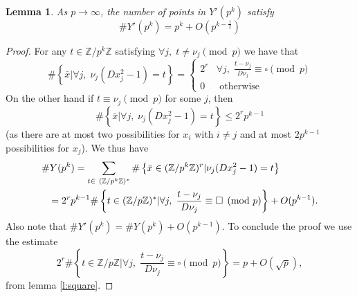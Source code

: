 \documentclass[12pt]{amsart}
\newtheorem{lem}{Lemma}[section]
\theoremstyle{definition}
\theoremstyle{remark}
\numberwithin{equation}{section}
\newcommand{\set}[1]{\left\{#1\right\}}
\newcommand{\bbZ}{\mathbb{Z}}
\begin{document}
\begin{lem}\label{l:count1}
As $p\to\infty$, the number of points in $Y'(p^k)$ satisfy
\[\# Y'(p^k)=p^k+O(p^{k-\frac{1}{2}})\]
\end{lem}
\begin{proof}
For any $t\in\bbZ/p^k\bbZ$ satisfying $\forall
j,\;t\neq\nu_j\pmod{p}$ we have that
\[\#\set{\bar{x}|\forall j,\;\nu_j(Dx_j^2-1)=t}=\left\lbrace\begin{array}{cc}
2^r & \forall j,\;\frac{t-\nu_j}{D\nu_j}\equiv \square\pmod{p}\\
 0 & \mbox{ otherwise}
\end{array}\right.
\]
On the other hand if $t\equiv\nu_j\pmod{p}$ for some $j$, then
\[\#\set{\bar{x}|\forall j,\;\nu_j(Dx_j^2-1)=t}\leq 2^{r}p^{k-1}\]
(as there are at most two possibilities for $x_i$ with $i\neq j$ and
at most $2p^{k-1}$ possibilities for $x_j$). We thus have
\begin{eqnarray*}\lefteqn{\# Y(p^k) = \sum_{t\in\
 (\bbZ/p^k\bbZ)^*}\#\set{\bar{x}\in(\bbZ/p^k\bbZ)^r|\nu_j(Dx_j^2-1)=t}}\\
&&= 2^rp^{k-1}\#\set{t\in(\bbZ/p\bbZ)^*| \forall
j,\;\frac{t-\nu_j}{D\nu_j}\equiv \square\pmod{p}}+O(p^{k-1}).
\end{eqnarray*}
Also note that  $\# Y'(p^k)=\# Y(p^k)+O(p^{k-1})$. To conclude the
proof we use the estimate
\[2^r\#\set{t\in\bbZ/p\bbZ| \forall j,\;\frac{t-\nu_j}{D\nu_j}\equiv \square\pmod{p}}=p+O(\sqrt{p}),\]
from lemma \ref{l:square}.

\end{proof}
\end{document}
